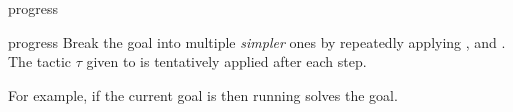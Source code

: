 \begin{tactic}{progress}
  \begin{tsyntax}[empty]{progress}
  Break the goal into multiple \emph{simpler} ones by repeatedly applying
  ,  and . The tactic $\tau$ given to
   is tentatively applied after each step.

  For example, if the current goal is
   then
  running 
  solves the goal.
  \end{tsyntax}

\end{tactic}
